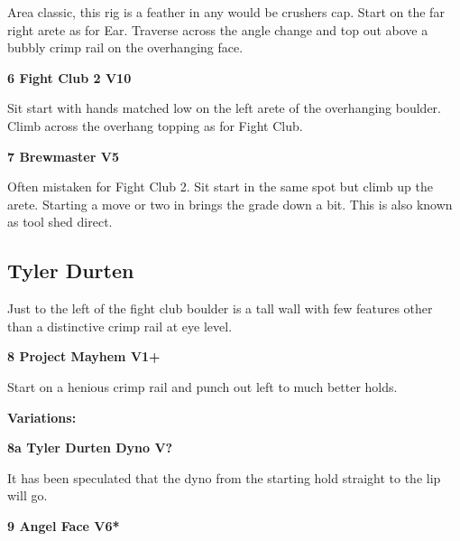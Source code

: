 \begin{multicols}{2}
					\begin{adjustwidth}{0.5cm}{}				
					Area classic, this rig is a feather in any would be crushers cap. Start on the far right arete as for Ear. Traverse across the angle change and top out above a bubbly crimp rail on the overhanging face.
					\end{adjustwidth}

					\label{rt:Fight Club 2}
\colorbox{red!20}{
\parbox{0.95\linewidth}{
\textbf{
6 Fight Club 2 V10    
}
}
}

					\begin{adjustwidth}{0.5cm}{}				
					Sit start with hands matched low on the left arete of the overhanging boulder. Climb across the overhang topping as for Fight Club.
					\end{adjustwidth}
					\label{rt:Brewmaster}
\colorbox{RoyalBlue!20}{
\parbox{0.95\linewidth}{
\textbf{
7 Brewmaster V5    
}
}
}

					\begin{adjustwidth}{0.5cm}{}				
					Often mistaken for Fight Club 2. Sit start in the same spot but climb up the arete. Starting a move or two in brings the grade down a bit. This is also known as tool shed direct.
					\end{adjustwidth}
			\subsection*{Tyler Durten}\label{bf:Tyler Durten}
			Just to the left of the fight club boulder is a tall wall with few features other than a distinctive crimp rail at eye level.\\
			
					\label{rt:Project Mayhem}
\colorbox{green!20}{
\parbox{0.95\linewidth}{
\textbf{
8 Project Mayhem V1+   
}
}
}

					\begin{adjustwidth}{0.5cm}{}				
					Start on a henious crimp rail and punch out left to much better holds.
					\end{adjustwidth}
						\begin{adjustwidth}{0.5cm}{}				
						\textbf{Variations:} \newline
							\label{vr:Tyler Durten Dyno}
\colorbox{black!20}{
\parbox{0.95\linewidth}{
\textbf{
8a Tyler Durten Dyno V?  
}
}
}

							\begin{adjustwidth}{0.5cm}{}				
							It has been speculated that the dyno from the starting hold straight to the lip will go.
							\end{adjustwidth}
						\end{adjustwidth}
					\label{rt:Angel Face}
\colorbox{RoyalBlue!20}{
\parbox{0.95\linewidth}{
\textbf{
9 Angel Face V6*  
}
}
}


\end{multicols}
